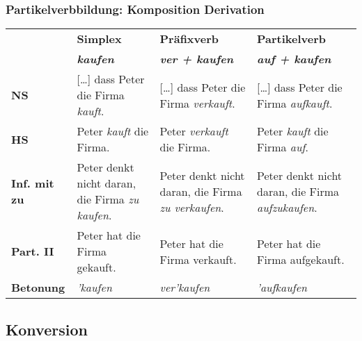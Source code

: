 \begin{frame}
\frametitle{Partikelverbbildung: Komposition \vs Derivation}

\begin{table}
\centering

\begin{tabular}{p{1.6cm}|p{3cm}|p{3cm}|p{3cm}}
 & \textbf{Simplex} & \textbf{Präfixverb} & \textbf{Partikelverb}\\
& \textit{\textbf{kaufen}} & \textit{\textbf{ver + kaufen}} & \textit{\textbf{auf + kaufen}}\\
\hline
\textbf{NS} & [\dots] dass Peter die Firma \textit{kauft}. & [\dots] dass Peter die Firma \textit{verkauft}. & [\dots] dass Peter die Firma \textit{aufkauft}.\\
\hline
\textbf{HS} & Peter \textit{kauft} die Firma. & Peter \textit{verkauft} die Firma. & Peter \textit{kauft} die Firma \textit{auf}. \\
\hline
\textbf{Inf. mit zu} & Peter denkt nicht daran, die Firma \textit{zu kaufen}. & Peter denkt nicht daran, die Firma \textit{zu verkaufen}. & Peter denkt nicht daran, die Firma \textit{aufzukaufen}.\\
\hline
\textbf{Part. II} & Peter hat die Firma gekauft. & Peter hat die Firma verkauft. & Peter hat die Firma aufgekauft. \\
\hline
\textbf{Betonung} & \textit{'kaufen} & \textit{ver'kaufen} & \textit{'aufkaufen}\\
\end{tabular}

\end{table}


\end{frame}


\subsection{Konversion}
%


